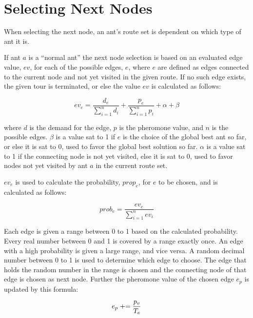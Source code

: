 \section{Selecting Next Nodes}
\label{sec:selectingNextNode}

When selecting the next node, an ant's route set is dependent on which type of ant it is. 

If ant $a$ is a ``normal ant'' the next node selection is based on an evaluated edge value, $ev$, for each of the possible edges, $e$, where $e$ are defined as edges connected to the current node and not yet visited in the given route. If no such edge exists, the given tour is terminated, or else %
the value $ev$ is calculated as follows: 

$$ev_e = \frac{d_e}{\sum\limits^{n}_{i=1}d_i} + \frac{p_e}{\sum\limits^{n}_{i=1}p_i} + \alpha + \beta$$

where $d$ is the demand for the edge, $p$ is the pheromone value, and $n$ is the possible edges. $\beta$ is a value sat to 1 if $e$ is the choice of the global best ant so far, or else it is sat to 0, used to favor the global best solution so far. %
$\alpha$ is a value sat to 1 if the connecting node is not yet visited, else it is sat to 0, used to favor nodes not yet visited by ant $a$ in the current route set.  

$ev_e$ is used to calculate the probability, $prop_e$, for $e$ to be chosen, and is calculated as follows:

$$prob_e = \frac{ev_e}{\sum\limits^{n}_{i=1}ev_i}$$

Each edge is given a range between 0 to 1 based on the calculated probability. Every real number between 0 and 1 is covered by a range exactly once. An edge with a high probability is given a large range, and vice versa. A random decimal number between 0 to 1 is used to determine which edge to choose. The edge that holds the random number in the range is chosen and the connecting node of that edge is chosen as next node. Further the pheromone value of the chosen edge $e_p$ is updated by this formula:

$$e_p \mathrel{+}= \frac{p_v}{T_e}$$ 

